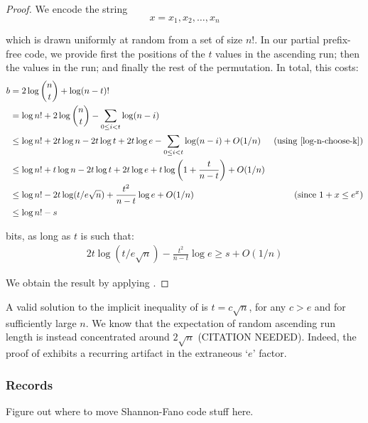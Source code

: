 \documentclass{patmorin}
\begin{document}
\begin{proof}
  We encode the string
  \[x = x_1, x_2, \ldots, x_n\]

  which is drawn uniformly at random from a set of size $n!$. In our
  partial prefix-free code, we provide first the positions of the $t$
  values in the ascending run; then the values in the run; and finally
  the rest of the permutation. In total, this costs:
  \begin{align*}
    b & = 2\log \binom{n}{t} + \log(n - t)! \\
      & = \log n! + 2 \log \binom{n}{t} - \sum_{0 \leq i < t} \log (n - i) \\
      & \le \log n! + 2t \log n - 2t \log t + 2t \log e - \sum_{0 \leq i < t} \log(n - i) + O(1/n)  & \text{(using \eqref{log-n-choose-k})}\\
      & \le \log n! + t \log n - 2t \log t + 2t \log e + t \log \left(1 + \frac{t}{n - t}\right) +  O(1/n) \\
      & \le \log n! - 2t \log(t/e\sqrt{n}) + \frac{t^2}{n - t} \log e + O(1/n) & \text{(since $1+x \le e^x$)} \\
      & \le \log n! - s
  \end{align*}

  bits, as long as $t$ is such that:
  \begin{align*}
    2t\log(t/e\sqrt{n}) - \frac{t^2}{n - t}\log e \ge s + O(1/n)
  \end{align*}

  We obtain the result by applying .
\end{proof}

\begin{rem}
  A valid solution to the implicit inequality of  is
  $t = c \sqrt{n}$, for any $c > e$ and for sufficiently large $n$. We
  know that the expectation of random ascending run length is instead
  concentrated around $2 \sqrt{n}$ (CITATION NEEDED). Indeed, the
  proof of  exhibits a recurring artifact in the
  extraneous `$e$' factor.
\end{rem}

\subsubsection{Records}

Figure out where to move Shannon-Fano code stuff here.  
\end{document}

